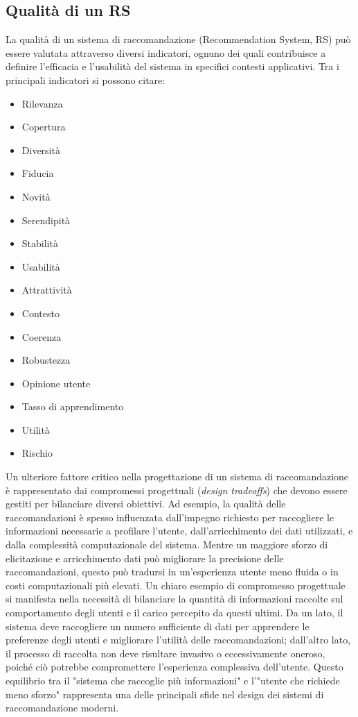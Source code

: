 \documentclass{report}
\begin{document}
	\subsection{Qualità di un RS}
	La qualità di un sistema di raccomandazione (Recommendation System, RS) può essere valutata attraverso diversi indicatori, ognuno dei quali contribuisce a definire l’efficacia e l’usabilità del sistema in specifici contesti applicativi. Tra i principali indicatori si possono citare:
	\begin{multicols}{3}
	\begin{itemize}
		\item Rilevanza
		\item Copertura
		\item Diversità
		\item Fiducia
		\item Novità
		\item Serendipità
		\item Stabilità
		\item Usabilità
		\item Attrattività
		\item Contesto
		\item Coerenza
		\item Robustezza
		\item Opinione utente
		\item Tasso di apprendimento
		\item Utilità
		\item Rischio
	\end{itemize}
	\end{multicols}
	Un ulteriore fattore critico nella progettazione di un sistema di raccomandazione è rappresentato dai compromessi progettuali (\textit{design tradeoffs}) che devono essere gestiti per bilanciare diversi obiettivi. Ad esempio, la qualità delle raccomandazioni è spesso influenzata dall'impegno richiesto per raccogliere le informazioni necessarie a profilare l'utente, dall’arricchimento dei dati utilizzati, e dalla complessità computazionale del sistema. Mentre un maggiore sforzo di elicitazione e arricchimento dati può migliorare la precisione delle raccomandazioni, questo può tradursi in un’esperienza utente meno fluida o in costi computazionali più elevati. Un chiaro esempio di compromesso progettuale si manifesta nella necessità di bilanciare la quantità di informazioni raccolte sul comportamento degli utenti e il carico percepito da questi ultimi. Da un lato, il sistema deve raccogliere un numero sufficiente di dati per apprendere le preferenze degli utenti e migliorare l'utilità delle raccomandazioni; dall'altro lato, il processo di raccolta non deve risultare invasivo o eccessivamente oneroso, poiché ciò potrebbe compromettere l'esperienza complessiva dell'utente. Questo equilibrio tra il "sistema che raccoglie più informazioni" e l'"utente che richiede meno sforzo" rappresenta una delle principali sfide nel design dei sistemi di raccomandazione moderni.
\end{document}
